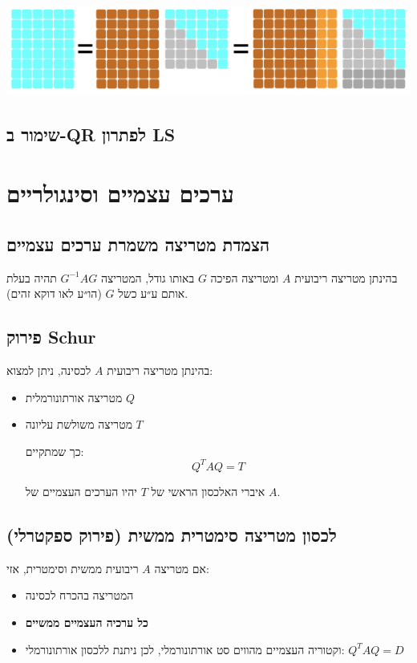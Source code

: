 \documentclass[11pt]{article}
\begin{document}
\begin{center}
\includegraphics[width=.9\linewidth]{./img/QR-tall-narrow.png}
\end{center}

\subsection{שימור ב-QR לפתרון LS}
\label{sec:org7fbfc3a}


\section{ערכים עצמיים וסינגולריים}
\label{sec:org89c97ee}

\subsection{הצמדת מטריצה משמרת ערכים עצמיים}
\label{sec:org3ed0aa4}
בהינתן מטריצה ריבועית \(A\) ומטריצה הפיכה \(G\) באותו גודל,
  המטריצה \(G^{-1}AG\) תהיה בעלת אותם ע״ע כשל \(G\) (הו״ע לאו דוקא זהים).

\subsection{פירוק Schur}
\label{sec:orgc46a927}
בהינתן מטריצה ריבועית \(A\) לכסינה, ניתן למצוא:
\begin{itemize}
\item מטריצה אורתונורמלית \(Q\)
\item מטריצה משולשת עליונה \(T\)

כך שמתקיים:
$$Q^TAQ=T$$

איברי האלכסון הראשי של \(T\) יהיו הערכים העצמיים של \(A\).
\end{itemize}

\subsection{לכסון מטריצה סימטרית ממשית (פירוק ספקטרלי)}
\label{sec:org726ff1d}
אם מטריצה \(A\) ריבועית ממשית וסימטרית, אזי:
\begin{itemize}
\item המטריצה בהכרח לכסינה
\item \textbf{כל ערכיה העצמיים ממשיים}
\item וקטוריה העצמיים מהווים סט אורתונורמלי, לכן ניתנת ללכסון אורתונורמלי: \(Q^TAQ=D\)
\end{itemize}
\end{document}
